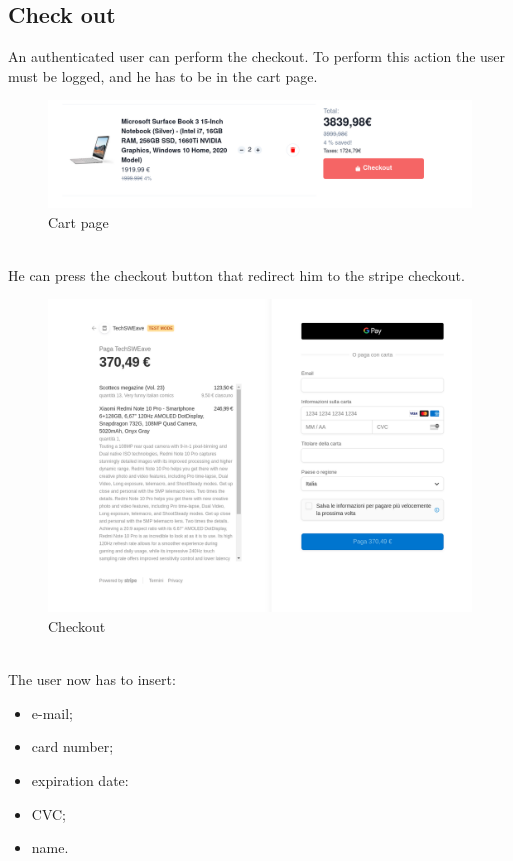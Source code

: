 \subsection{Check out}
An authenticated user can perform the checkout. To perform this action the user must be logged, and he has to be in the cart page.
\begin{figure}[!ht]
    \caption{Cart page}
    \vspace{10px}
    \includegraphics[scale=0.35]{../../../../Images/userManual/cart.png}
    \centering
\end{figure}
\\
He can press the checkout button that redirect him to the stripe checkout.
\begin{figure}[!ht]
    \caption{Checkout}
    \vspace{10px}
    \includegraphics[scale=0.3]{../../../../Images/userManual/checkout.png}
    \centering
\end{figure}
\\
The user now has to insert:
\begin{itemize}
    \item e-mail;
    \item card number;
    \item expiration date:
    \item CVC;
    \item name.
\end{itemize}
